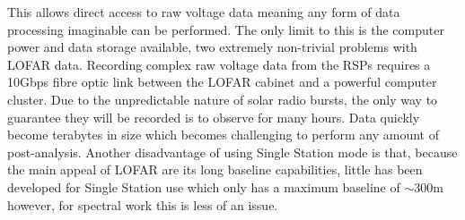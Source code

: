 This allows direct access to raw voltage data meaning any form of data processing imaginable can be performed. The only limit to this is the computer power and data storage available, two extremely non-trivial problems with LOFAR data. Recording complex raw voltage data from the RSPs requires a 10Gbps fibre optic link between the LOFAR cabinet and a powerful computer cluster. Due to the unpredictable nature of solar radio bursts, the only way to guarantee they will be recorded is to observe for many hours. Data quickly become terabytes in size which becomes challenging to perform any amount of post-analysis.
Another disadvantage of using Single Station mode is that, because the main appeal of LOFAR are its long baseline capabilities, little has been developed for Single Station use which only has a maximum baseline of $\sim 300$m however, for spectral work this is less of an issue.



